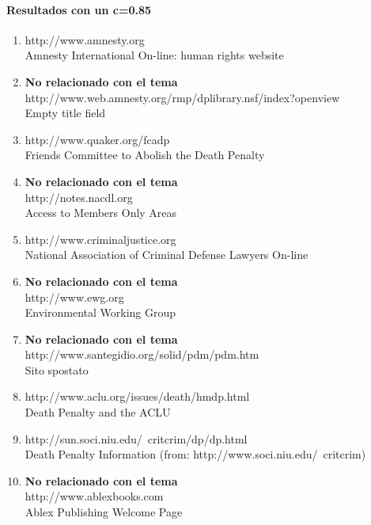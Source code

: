 \paragraph{Resultados con un c=0.85}
 \begin{enumerate}

\item
http://www.amnesty.org\\
Amnesty International On-line: human rights website\\
\item
\textbf{No relacionado con el tema}\\
http://www.web.amnesty.org/rmp/dplibrary.nsf/index?openview\\
Empty title field\\
\item
http://www.quaker.org/fcadp\\
Friends Committee to Abolish the Death Penalty\\
\item
\textbf{No relacionado con el tema}\\
http://notes.nacdl.org\\
Access to Members Only Areas\\
\item
http://www.criminaljustice.org\\
National Association of Criminal Defense Lawyers On-line\\
\item
\textbf{No relacionado con el tema}\\
http://www.ewg.org\\
Environmental Working Group\\
\item
\textbf{No relacionado con el tema}\\
http://www.santegidio.org/solid/pdm/pdm.htm\\
Sito spostato\\
\item
http://www.aclu.org/issues/death/hmdp.html\\
Death Penalty and the ACLU\\
\item
http://sun.soci.niu.edu/~critcrim/dp/dp.html\\
Death Penalty Information (from: http://www.soci.niu.edu/~critcrim)\\
\item
\textbf{No relacionado con el tema}\\
http://www.ablexbooks.com\\
Ablex Publishing Welcome Page\\


\end{enumerate}
